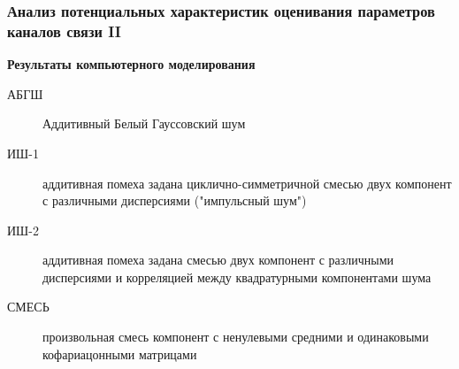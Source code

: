 \begin{frame}
	\frametitle{Анализ потенциальных характеристик оценивания параметров каналов связи II}
	\begin{minipage}[t]{0.47\linewidth}
		\begin{center}
			\textbf{Результаты компьютерного моделирования}
		\end{center}
	\end{minipage}
	\hfill
	\begin{minipage}[t]{0.47\linewidth}
		{
			\scriptsize
			\begin{description}
				\item [АБГШ] Аддитивный Белый Гауссовский шум
				\item [ИШ-1] аддитивная помеха задана циклично-симметричной смесью двух компонент с различными дисперсиями ("импульсный шум")
				\item [ИШ-2] аддитивная помеха задана смесью двух компонент с различными дисперсиями и корреляцией между квадратурными компонентами шума
				\item [СМЕСЬ] произвольная смесь компонент с ненулевыми средними и одинаковыми кофариацонными матрицами
			\end{description}	
		}
	\end{minipage}

\end{frame}

